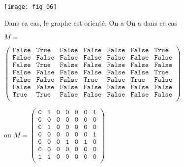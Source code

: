 \begin{exemple}
\begin{minipage}[b]{.47\linewidth}
\end{minipage}\hfill
\begin{minipage}[b]{.47\linewidth}
\begin{center}
\texttt{[image: fig\_06]}
\end{center}
Dans ca cas, le graphe est orienté. On a 
On a dans ce cas 

\footnotesize{$
M = $

$
\begin{pmatrix}
\texttt{False} & \texttt{True} & \texttt{False} & \texttt{False} & \texttt{False} & \texttt{False} & \texttt{True} \\
\texttt{False} & \texttt{False} & \texttt{False} & \texttt{False} & \texttt{False} & \texttt{False} & \texttt{False} \\ 
\texttt{False} & \texttt{True} & \texttt{False} & \texttt{False} & \texttt{False} & \texttt{False} & \texttt{False} \\
\texttt{False} & \texttt{False} & \texttt{False} & \texttt{False} & \texttt{False} & \texttt{False} & \texttt{True} \\
\texttt{False} & \texttt{False} & \texttt{False} & \texttt{True} & \texttt{False} & \texttt{True} & \texttt{False} \\
\texttt{False} & \texttt{False} & \texttt{False} & \texttt{False} & \texttt{False} & \texttt{False} & \texttt{False} \\
\texttt{True} & \texttt{True} & \texttt{False} & \texttt{False} & \texttt{False} & \texttt{False} & \texttt{False} \\
\end{pmatrix}$}

ou 
\footnotesize{$
M =
\begin{pmatrix}
\texttt{0} & \texttt{1} & \texttt{0} & \texttt{0} & \texttt{0} & \texttt{0} & \texttt{1} \\
\texttt{0} & \texttt{0} & \texttt{0} & \texttt{0} & \texttt{0} & \texttt{0} & \texttt{0} \\ 
\texttt{0} & \texttt{1} & \texttt{0} & \texttt{0} & \texttt{0} & \texttt{0} & \texttt{0} \\
\texttt{0} & \texttt{0} & \texttt{0} & \texttt{0} & \texttt{0} & \texttt{0} & \texttt{1} \\
\texttt{0} & \texttt{0} & \texttt{0} & \texttt{1} & \texttt{0} & \texttt{1} & \texttt{0} \\
\texttt{0} & \texttt{0} & \texttt{0} & \texttt{0} & \texttt{0} & \texttt{0} & \texttt{0} \\
\texttt{1} & \texttt{1} & \texttt{0} & \texttt{0} & \texttt{0} & \texttt{0} & \texttt{0} \\
\end{pmatrix}$}

\end{minipage}
\end{exemple}


